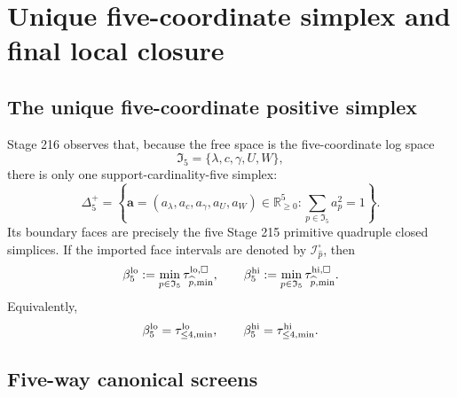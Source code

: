 
\section{Unique five-coordinate simplex and final local closure}
\label{sec:part06-unique-five-simplex-final-local-closure}

\subsection{The unique five-coordinate positive simplex}
\label{subsec:part06-unique-five-coordinate-simplex}

Stage 216 observes that, because the free space is the five-coordinate log space
\begin{equation}
\label{eq:part06-five-axis-set}
\mathfrak I_5=\{\lambda,c,\gamma,U,W\},
\end{equation}
there is only one support-cardinality-five simplex:
\begin{equation}
\label{eq:part06-five-simplex}
\Delta_5^+
=
\left\{
\mathbf a=(a_\lambda,a_c,a_\gamma,a_U,a_W)\in\mathbb R_{\ge0}^{5}:
\sum_{p\in\mathfrak I_5}a_p^2=1
\right\}.
\end{equation}
Its boundary faces are precisely the five Stage 215 primitive quadruple closed simplices.  If the imported face intervals are denoted by \(\mathcal I_{\widehat p}^{\square}\), then
\begin{equation}
\label{eq:part06-five-boundary-minima}
\beta_5^{\rm lo}:=\min_{p\in\mathfrak I_5}\tau_{\widehat p,\min}^{\rm lo,\square},
\qquad
\beta_5^{\rm hi}:=\min_{p\in\mathfrak I_5}\tau_{\widehat p,\min}^{\rm hi,\square}.
\end{equation}
Equivalently,
\begin{equation}
\label{eq:part06-five-boundary-equals-le4}
\beta_5^{\rm lo}=\tau_{\le4,\min}^{\rm lo},
\qquad
\beta_5^{\rm hi}=\tau_{\le4,\min}^{\rm hi}.
\end{equation}

\subsection{Five-way canonical screens}
\label{subsec:part06-five-way-canonical-screens}

